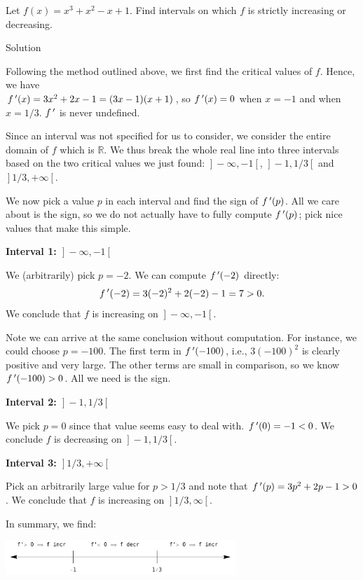 \begin{example}\label{ex_incr1}
Let $f(x) = x^3+x^2-x+1$. Find intervals on which $f$ is strictly increasing or decreasing.

Solution 

Following the method outlined above, we first find the critical values of $f$. Hence, we have \\ $f\,'(x) = 3x^2+2x-1 = (3x-1)(x+1)$, so $f\,'(x) = 0$ when $x=-1$ and when $x=1/3$. $f\,'$ is never undefined.

Since an interval was not specified for us to consider, we consider the entire domain of $f$ which is $\mathbb{R}$. We thus break the whole real line into three intervals based on the two critical values we just found: $\left.\right]-\infty,-1\left[\right.$, $\left.\right]-1,1/3\left[\right.$ and $\left.\right]1/3,+\infty\left[\right.$.


We now pick a value $p$ in each interval and find the sign of $f\,'(p)$. All we care about is the sign, so we do not actually have to fully compute $f\,'(p)$; pick nice values that make this simple.
\begin{description}
\item \textbf{Interval 1: $\left.\right]-\infty,-1\left[\right.$}

We (arbitrarily) pick $p=-2$. We can compute $f\,'(-2)$ directly: $$f\,'(-2) = 3(-2)^2+2(-2)-1=7>0.$$ We conclude that $f$ is increasing on $\left.\right]-\infty,-1\left[\right.$.

Note we can arrive at the same conclusion without computation. For instance, we could choose $p=-100$. The first term in $f\,'(-100)$, i.e., $3(-100)^2$ is clearly positive and very large. The other terms are small in comparison, so we know $f\,'(-100)>0$. All we need is the sign.

\item \textbf{Interval 2: $\left.\right]-1,1/3\left[\right.$}

We pick $p=0$ since that value seems easy to deal with. $f\,'(0) = -1<0$. We conclude $f$ is decreasing on $\left.\right]-1,1/3\left[\right.$.

\item\textbf{Interval 3: $\left.\right]1/3,+\infty\left[\right.$}

Pick an arbitrarily large value for $p>1/3$ and note that $f\,'(p) =3p^2+2p-1 >0$. We conclude that $f$ is increasing on $\left.\right]1/3,\infty\left[\right.$.

\end{description}
In summary, we find: 
	\begin{center}
			\includegraphics[width=0.65\textwidth]{fig_behaviour_10}
	\end{center}
	

\end{example}
